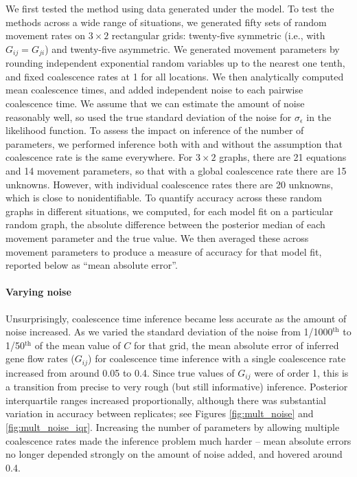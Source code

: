 \documentclass{article}
\begin{document}
We first tested the method using data generated under the model.
To test the methods across a wide range of situations,
we generated fifty sets of random movement rates on $3 \times 2$ rectangular grids:
twenty-five symmetric (i.e., with $G_{ij} = G_{ji}$) and twenty-five asymmetric.
We generated movement parameters
by rounding independent exponential random variables up to the nearest one tenth,
and fixed coalescence rates at 1 for all locations.
We then analytically computed mean coalescence times,
and added independent noise to each pairwise coalescence time.
We assume that we can estimate the amount of noise reasonably well, 
so used the true standard deviation of the noise for $\sigma_\epsilon$ in the likelihood function.
To assess the impact on inference of the number of parameters,
we performed inference both with and without the assumption 
that coalescence rate is the same everywhere.
For $3 \times 2$ graphs, there are 21 equations
and 14 movement parameters,
so that with a global coalescence rate there are 15 unknowns.
However, with individual coalescence rates there are 20 unknowns,
which is close to nonidentifiable.
To quantify accuracy across these random graphs in different situations,
we computed, for each model fit on a particular random graph,
the absolute difference between the posterior median of each movement parameter
and the true value.
We then averaged these across movement parameters to produce a measure of accuracy for that model fit,
reported below as ``mean absolute error''.


\paragraph{Varying noise}
Unsurprisingly, coalescence time inference became less accurate as the amount of noise increased.
As we varied the standard deviation of the noise
from 1/1000${}^\text{th}$ to 1/50${}^\text{th}$ of the mean value of $C$ for that grid,
the mean absolute error of inferred gene flow rates ($G_{ij}$) 
for coalescence time inference with a single coalescence rate
increased from around 0.05 to 0.4.
Since true values of $G_{ij}$ were of order 1,
this is a transition from precise to very rough (but still informative) inference.
Posterior interquartile ranges increased proportionally,
although there was substantial variation in accuracy between replicates;
see Figures \ref{fig:mult_noise} and \ref{fig:mult_noise_iqr}.
Increasing the number of parameters by allowing multiple coalescence rates
made the inference problem much harder --
mean absolute errors no longer depended strongly on the amount of noise added,
and hovered around 0.4.
\end{document}
